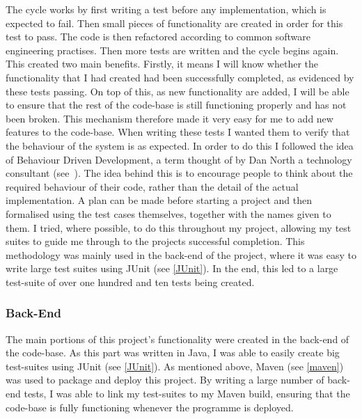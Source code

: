 The cycle works by first writing a test before any implementation, which is expected to fail. Then small pieces of functionality are created in order for this test to pass. The code is then refactored according to common software engineering practises. Then more tests are written and the cycle begins again. This created two main benefits. Firstly, it means I will know whether the functionality that I had created had been successfully completed, as evidenced by these tests passing. On top of this, as new functionality are added, I will be able to ensure that the rest of the code-base is still functioning properly and has not been broken. This mechanism therefore made it very easy for me to add new features to the code-base. When writing these tests I wanted them to verify that the behaviour of the system is as expected. In order to do this I followed the idea of Behaviour Driven Development, a term thought of by Dan North a technology consultant (see~\cite{danNorth}). The idea behind this is to encourage people to think about the required behaviour of their code, rather than the detail of the actual implementation. A plan can be made before starting a project and then formalised using the test cases themselves, together with the names given to them. I tried, where possible, to do this throughout my project, allowing my test suites to guide me through to the projects successful completion. This methodology was mainly used in the back-end of the project, where it was easy to write large test suites using JUnit (see \ref{JUnit}). In the end, this led to a large test-suite of over one hundred and ten tests being created. 

\subsubsection{Back-End}
The main portions of this project's functionality were created in the back-end of the code-base. As this part was written in Java, I was able to easily create big test-suites using JUnit (see \ref{JUnit}). As mentioned above, Maven (see \ref{maven}) was used to package and deploy this project. By writing a large number of back-end tests, I was able to link my test-suites to my Maven build, ensuring that the code-base is fully functioning whenever the programme is deployed.

